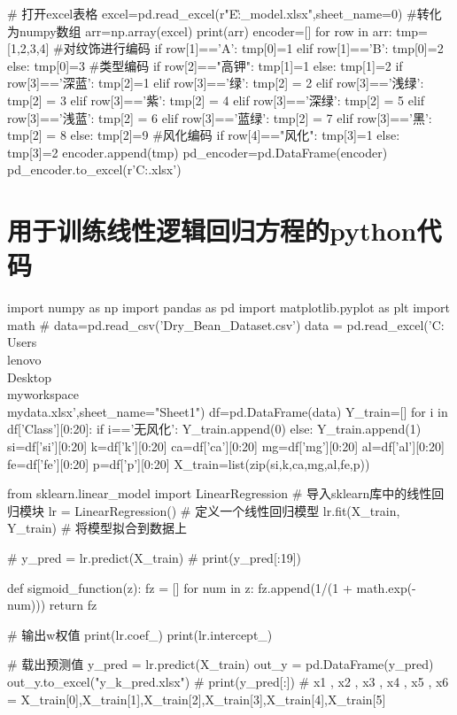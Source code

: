 \documentclass[withoutpreface,bwprint]{cumcmthesis} %
\begin{document}
\begin{appendices}
\begin{python}
	# 打开excel表格
	excel=pd.read_excel(r"E:\G\exercise\github{}_model\C{}.xlsx",sheet_name=0)
	#转化为numpy数组
	arr=np.array(excel)
	print(arr)
	encoder=[]
	for row in arr:
	tmp=[1,2,3,4]
	#对纹饰进行编码
	if row[1]=='A':
	tmp[0]=1
	elif row[1]=='B':
	tmp[0]=2
	else:
	tmp[0]=3
	#类型编码
	if row[2]=="高钾":
	tmp[1]=1
	else:
	tmp[1]=2
	if row[3]=='深蓝':
	tmp[2]=1
	elif row[3]=='绿':
	tmp[2] = 2
	elif row[3]=='浅绿':
	tmp[2] = 3
	elif row[3]=='紫':
	tmp[2] = 4
	elif row[3]=='深绿':
	tmp[2] = 5
	elif row[3]=='浅蓝':
	tmp[2] = 6
	elif row[3]=='蓝绿':
	tmp[2] = 7
	elif row[3]=='黑':
	tmp[2] = 8
	else:
	tmp[2]=9
	#风化编码
	if row[4]=="风化":
	tmp[3]=1
	else:
	tmp[3]=2
	encoder.append(tmp)
	pd_encoder=pd.DataFrame(encoder)
	pd_encoder.to_excel(r'C:\Users{}\Desktop{}.xlsx')
\end{python}


\section{用于训练线性逻辑回归方程的python代码}

\begin{python}
	import numpy as np
	import pandas as pd
	import matplotlib.pyplot as plt
	import math
	# data=pd.read_csv('Dry_Bean_Dataset.csv')
	data = pd.read_excel('C:\\Users\\lenovo\\Desktop\\myworkspace\\mydata.xlsx',sheet_name="Sheet1")
	df=pd.DataFrame(data)
	Y_train=[]
	for i in df['Class'][0:20]:
	if i=='无风化':
	Y_train.append(0)
	else:
	Y_train.append(1)
	si=df['si'][0:20]
	k=df['k'][0:20]
	ca=df['ca'][0:20]
	mg=df['mg'][0:20]
	al=df['al'][0:20]
	fe=df['fe'][0:20]
	p=df['p'][0:20]
	X_train=list(zip(si,k,ca,mg,al,fe,p))
	
	from sklearn.linear_model import LinearRegression # 导入sklearn库中的线性回归模块
	lr = LinearRegression()                           # 定义一个线性回归模型
	lr.fit(X_train, Y_train)                          # 将模型拟合到数据上
	
	# y_pred = lr.predict(X_train)
	# print(y_pred[:19])
	
	def sigmoid_function(z):
	fz = []
	for num in z:
	fz.append(1/(1 + math.exp(-num)))
	return fz
	
	# 输出w权值
	print(lr.coef_)
	print(lr.intercept_)
	
	# 载出预测值
	y_pred = lr.predict(X_train)
	out_y = pd.DataFrame(y_pred)
	out_y.to_excel("y_k_pred.xlsx")
	# print(y_pred[:])
	# x1 , x2 , x3 , x4 , x5 , x6 = X_train[0],X_train[1],X_train[2],X_train[3],X_train[4],X_train[5]
	

\end{python}
\end{appendices}
\end{document}
